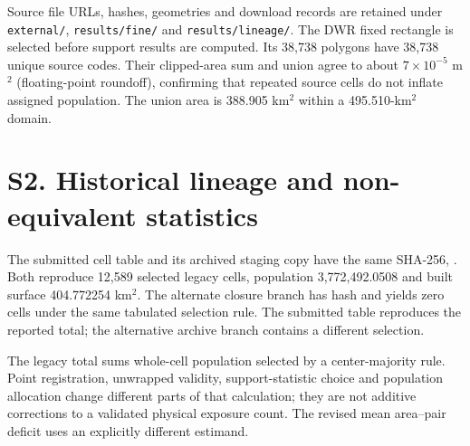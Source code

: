 \documentclass[10pt,a4paper]{article}
\begin{document}
Source file URLs, hashes, geometries and download records are retained under \texttt{external/}, \texttt{results/fine/} and \texttt{results/lineage/}. The DWR fixed rectangle is selected before support results are computed. Its 38,738 polygons have 38,738 unique source codes. Their clipped-area sum and union agree to about $7\times10^{-5}$ m$^2$ (floating-point roundoff), confirming that repeated source cells do not inflate assigned population. The union area is 388.905 km$^2$ within a 495.510-km$^2$ domain.


\section*{S2. Historical lineage and non-equivalent statistics}
The submitted cell table and its archived staging copy have the same SHA-256, . Both reproduce 12,589 selected legacy cells, population 3,772,492.0508 and built surface 404.772254 km$^2$. The alternate closure branch has hash  and yields zero cells under the same tabulated selection rule. The submitted table reproduces the reported total; the alternative archive branch contains a different selection.

The legacy total sums whole-cell population selected by a center-majority rule. Point registration, unwrapped validity, support-statistic choice and population allocation change different parts of that calculation; they are not additive corrections to a validated physical exposure count. The revised mean area--pair deficit uses an explicitly different estimand.
\end{document}
